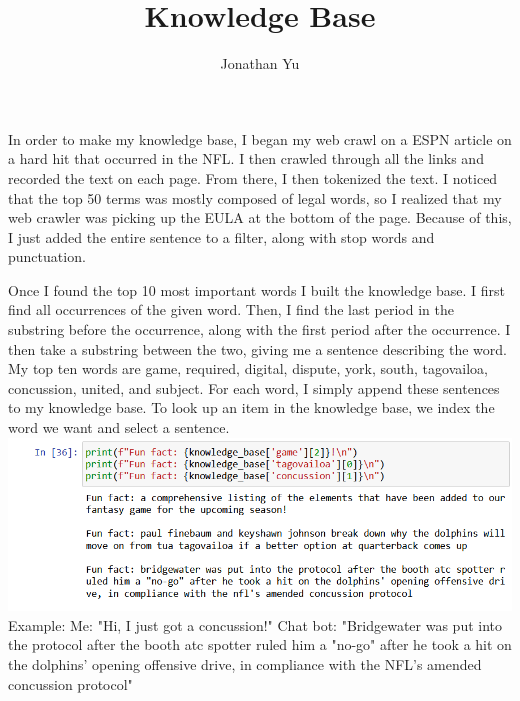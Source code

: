 \documentclass{article}
\title{Knowledge Base}
\author{Jonathan Yu}
\let\n\newline
\begin{document}
\renewcommand{\arraystretch}{1.5}
\maketitle
In order to make my knowledge base, I began my web crawl on a ESPN article on a hard hit that occurred in the NFL. I then crawled through all the links and recorded the text on each page. From there, I then tokenized the text. I noticed that the top 50 terms was mostly composed of legal words, so I realized that my web crawler was picking up the EULA at the bottom of the page. Because of this, I just added the entire sentence to a filter, along with stop words and punctuation.

Once I found the top 10 most important words I built the knowledge base. I first find all occurrences of the given word. Then, I find the last period in the substring before the occurrence, along with the first period after the occurrence. I then take a substring between the two, giving me a sentence describing the word.
My top ten words are game, required, digital, dispute, york, south, tagovailoa, concussion, united, and subject. For each word, I simply append these sentences to my knowledge base. To look up an item in the knowledge base, we index the word we want and select a sentence. \n
\includegraphics[width=14cm]{firefox_MtCSn75IKg.png}\n
Example:\n
Me: "Hi, I just got a concussion!"\n
Chat bot: "Bridgewater was put into the protocol after the booth atc spotter ruled him a "no-go" after he took a hit on the dolphins' opening offensive drive, in compliance with the NFL's amended concussion protocol"
\end{document}
